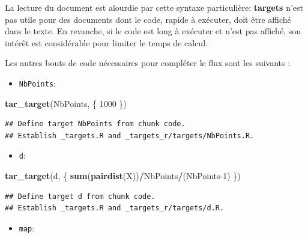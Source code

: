 \documentclass[
  12pt,
  french,
  a4paper,
  extrafontsizes,onecolumn,openright
  ]{memoir}
\newenvironment{Shaded}{\begin{snugshade}}{\end{snugshade}}
\newcommand{\DecValTok}[1]{\textcolor[rgb]{0.00,0.00,0.81}{#1}}
\newcommand{\KeywordTok}[1]{\textcolor[rgb]{0.13,0.29,0.53}{\textbf{#1}}}
\newcommand{\NormalTok}[1]{#1}
\newcommand{\OperatorTok}[1]{\textcolor[rgb]{0.81,0.36,0.00}{\textbf{#1}}}
\providecommand{\tightlist}{%
  \setlength{\itemsep}{0pt}\setlength{\parskip}{0pt}}
\begin{document}
La lecture du document est alourdie par cette syntaxe particulière: \textbf{targets} n'est pas utile pour des documents dont le code, rapide à exécuter, doit être affiché dans le texte.
En revanche, si le code est long à exécuter et n'est pas affiché, son intérêt est considérable pour limiter le temps de calcul.

Les autres bouts de code nécessaires pour compléter le flux sont les suivants :

\begin{itemize}
\tightlist
\item
  \texttt{NbPoints}:
\end{itemize}

\scriptsize

\begin{Shaded}
\begin{Highlighting}[]
\KeywordTok{tar_target}\NormalTok{(NbPoints, \{}
    \DecValTok{1000}
\NormalTok{\})}
\end{Highlighting}
\end{Shaded}

\begin{verbatim}
## Define target NbPoints from chunk code.
## Establish _targets.R and _targets_r/targets/NbPoints.R.
\end{verbatim}

\normalsize

\begin{itemize}
\tightlist
\item
  \texttt{d}:
\end{itemize}

\scriptsize

\begin{Shaded}
\begin{Highlighting}[]
\KeywordTok{tar_target}\NormalTok{(d, \{}
    \KeywordTok{sum}\NormalTok{(}\KeywordTok{pairdist}\NormalTok{(X))}\OperatorTok{/}\NormalTok{NbPoints}\OperatorTok{/}\NormalTok{(NbPoints}\DecValTok{-1}\NormalTok{)}
\NormalTok{\})}
\end{Highlighting}
\end{Shaded}

\begin{verbatim}
## Define target d from chunk code.
## Establish _targets.R and _targets_r/targets/d.R.
\end{verbatim}

\normalsize

\begin{itemize}
\tightlist
\item
  \texttt{map}:
\end{itemize}
\end{document}
